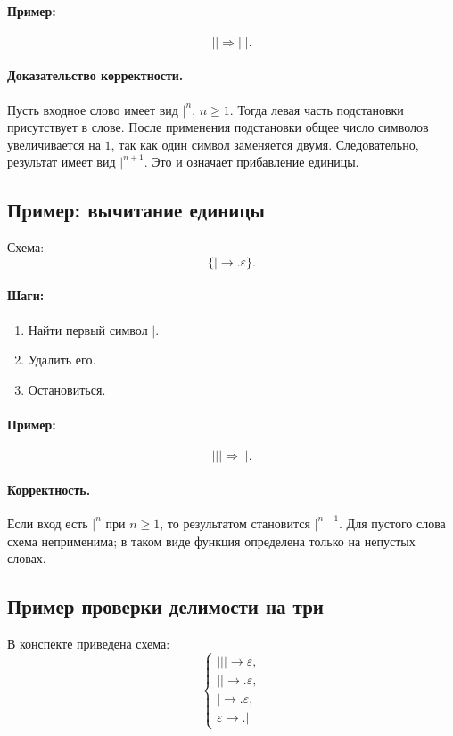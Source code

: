 \documentclass[12pt,a4paper]{article}
\begin{document}
\paragraph{Пример:}
\[
|| \Rightarrow |||.
\]

\paragraph{Доказательство корректности.}
Пусть входное слово имеет вид $|^n$, $n\ge 1$. Тогда левая часть подстановки присутствует в слове. После применения подстановки общее число символов увеличивается на $1$, так как один символ заменяется двумя. Следовательно, результат имеет вид $|^{n+1}$. Это и означает прибавление единицы.

\subsection{Пример: вычитание единицы}
Схема:
\[
\{| \to. \varepsilon\}.
\]

\paragraph{Шаги:}
\begin{enumerate}
    \item Найти первый символ $|$.
    \item Удалить его.
    \item Остановиться.
\end{enumerate}

\paragraph{Пример:}
\[
||| \Rightarrow ||.
\]

\paragraph{Корректность.}
Если вход есть $|^n$ при $n\ge 1$, то результатом становится $|^{n-1}$. Для пустого слова схема неприменима; в таком виде функция определена только на непустых словах.

\subsection{Пример проверки делимости на три}
В конспекте приведена схема:
\[
\left\{
\begin{array}{l}
||| \to \varepsilon,\\
|| \to. \varepsilon,\\
| \to. \varepsilon,\\
\varepsilon \to. |
\end{array}
\right.
\]
\end{document}
